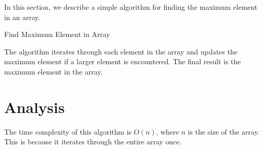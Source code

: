 \documentclass[addpoints,answers,12pt]{exam} %
\begin{document}
	In this section, we describe a simple algorithm for finding the maximum element in an array.
	
	\begin{algorithm}
		\caption{Find Maximum Element in Array}\label{alg:findMax}
		\BlankLine
		\;
	\end{algorithm}
	
	The algorithm iterates through each element in the array and updates the maximum element if a larger element is encountered. The final result is the maximum element in the array.
	
	\section{Analysis}
	
	The time complexity of this algorithm is $O(n)$, where $n$ is the size of the array. This is because it iterates through the entire array once.
	
	
	\vspace{10cm}
	
	
	
\end{document}
